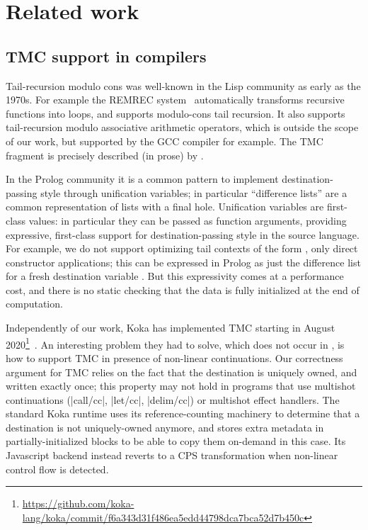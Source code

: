\section{Related work}

\subsection{TMC support in compilers}

Tail-recursion modulo cons was well-known in the Lisp community as
early as the 1970s. For example the REMREC system~\citep*{risch-73}
automatically transforms recursive functions into loops, and
supports modulo-cons tail recursion. It also supports tail-recursion
modulo associative arithmetic operators, which is outside the scope
of our work, but supported by the GCC compiler for example. The TMC
fragment is precisely described (in prose) by \citet*{friedman-wise-75}.

In the Prolog community it is a common pattern to implement destination-passing style through unification variables; in particular ``difference lists'' are a common representation of lists with a final hole.
Unification variables are first-class values: in particular they can be passed as function arguments, providing expressive, first-class support for destination-passing style in the source language.
For example, we do not support optimizing tail contexts of the form , only direct constructor applications; this can be expressed in Prolog as just the difference list  for a fresh destination variable .
But this expressivity comes at a performance cost, and there is no static checking that the data is fully initialized at the end of computation.

Independently of our work, Koka has implemented TMC starting in August
2020\footnote{\url{https://github.com/koka-lang/koka/commit/f6a343d31f486ea5edd44798dca7bca52d7b450c}}~\citep*{tmc-koka-2023}.
An interesting problem they had to solve, which does not occur in \OCaml,
is how to support TMC in presence of non-linear continuations. Our
correctness argument for TMC relies on the fact that the destination
is uniquely owned, and written exactly once; this property may not
hold in programs that use multishot continuations (\ocaml|call/cc|,
\ocaml|let/cc|, \ocaml|delim/cc|) or multishot effect handlers. The standard Koka runtime uses its
reference-counting machinery to determine that a destination is not
uniquely-owned anymore, and stores extra metadata in
partially-initialized blocks to be able to copy them on-demand in this
case. Its Javascript backend instead reverts to a CPS transformation
when non-linear control flow is detected.

